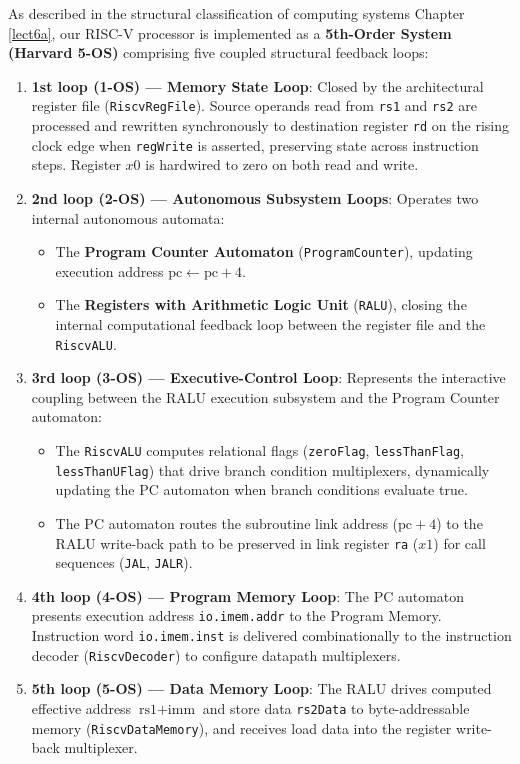 As described in the structural classification of computing systems Chapter \ref{lect6a}, our RISC-V processor is implemented as a \textbf{5th-Order System (Harvard 5-OS)} comprising five coupled structural feedback loops:
\begin{enumerate}
    \item \textbf{1st loop (1-OS) --- Memory State Loop}: Closed by the architectural register file (\texttt{RiscvRegFile}). Source operands read from \texttt{rs1} and \texttt{rs2} are processed and rewritten synchronously to destination register \texttt{rd} on the rising clock edge when \texttt{regWrite} is asserted, preserving state across instruction steps. Register $x0$ is hardwired to zero on both read and write.
    \item \textbf{2nd loop (2-OS) --- Autonomous Subsystem Loops}: Operates two internal autonomous automata:
    \begin{itemize}
        \item The \textbf{Program Counter Automaton} (\texttt{ProgramCounter}), updating execution address $\text{pc} \leftarrow \text{pc} + 4$.
        \item The \textbf{Registers with Arithmetic Logic Unit} (\texttt{RALU}), closing the internal computational feedback loop between the register file and the \texttt{RiscvALU}.
    \end{itemize}
    \item \textbf{3rd loop (3-OS) --- Executive-Control Loop}: Represents the interactive coupling between the RALU execution subsystem and the Program Counter automaton:
    \begin{itemize}
        \item The \texttt{RiscvALU} computes relational flags (\texttt{zeroFlag}, \texttt{lessThanFlag}, \texttt{lessThanUFlag}) that drive branch condition multiplexers, dynamically updating the PC automaton when branch conditions evaluate true.
        \item The PC automaton routes the subroutine link address ($\text{pc} + 4$) to the RALU write-back path to be preserved in link register \texttt{ra} ($x1$) for call sequences (\texttt{JAL}, \texttt{JALR}).
    \end{itemize}
    \item \textbf{4th loop (4-OS) --- Program Memory Loop}: The PC automaton presents execution address \texttt{io.imem.addr} to the Program Memory. Instruction word \texttt{io.imem.inst} is delivered combinationally to the instruction decoder (\texttt{RiscvDecoder}) to configure datapath multiplexers.
    \item \textbf{5th loop (5-OS) --- Data Memory Loop}: The RALU drives computed effective address $\text{rs1} + \text{imm}$ and store data \texttt{rs2Data} to byte-addressable memory (\texttt{RiscvDataMemory}), and receives load data into the register write-back multiplexer.
\end{enumerate}

